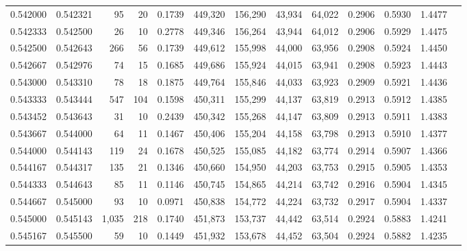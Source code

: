 \begin{tabular}{rrrrrrrrrrrrr}
0.542000 & 0.542321 &    95 &  20 &                                     0.1739 & 449,320 & 156,290 &  43,934 &  64,022 & 0.2906 & 0.5930 & 1.4477 \\
0.542333 & 0.542500 &    26 &  10 &                                     0.2778 & 449,346 & 156,264 &  43,944 &  64,012 & 0.2906 & 0.5929 & 1.4475 \\
0.542500 & 0.542643 &   266 &  56 &                                     0.1739 & 449,612 & 155,998 &  44,000 &  63,956 & 0.2908 & 0.5924 & 1.4450 \\
0.542667 & 0.542976 &    74 &  15 &                                     0.1685 & 449,686 & 155,924 &  44,015 &  63,941 & 0.2908 & 0.5923 & 1.4443 \\
0.543000 & 0.543310 &    78 &  18 &                                     0.1875 & 449,764 & 155,846 &  44,033 &  63,923 & 0.2909 & 0.5921 & 1.4436 \\
0.543333 & 0.543444 &   547 & 104 &                                     0.1598 & 450,311 & 155,299 &  44,137 &  63,819 & 0.2913 & 0.5912 & 1.4385 \\
0.543452 & 0.543643 &    31 &  10 &                                     0.2439 & 450,342 & 155,268 &  44,147 &  63,809 & 0.2913 & 0.5911 & 1.4383 \\
0.543667 & 0.544000 &    64 &  11 &                                     0.1467 & 450,406 & 155,204 &  44,158 &  63,798 & 0.2913 & 0.5910 & 1.4377 \\
0.544000 & 0.544143 &   119 &  24 &                                     0.1678 & 450,525 & 155,085 &  44,182 &  63,774 & 0.2914 & 0.5907 & 1.4366 \\
0.544167 & 0.544317 &   135 &  21 &                                     0.1346 & 450,660 & 154,950 &  44,203 &  63,753 & 0.2915 & 0.5905 & 1.4353 \\
0.544333 & 0.544643 &    85 &  11 &                                     0.1146 & 450,745 & 154,865 &  44,214 &  63,742 & 0.2916 & 0.5904 & 1.4345 \\
0.544667 & 0.545000 &    93 &  10 &                                     0.0971 & 450,838 & 154,772 &  44,224 &  63,732 & 0.2917 & 0.5904 & 1.4337 \\
0.545000 & 0.545143 & 1,035 & 218 &                                     0.1740 & 451,873 & 153,737 &  44,442 &  63,514 & 0.2924 & 0.5883 & 1.4241 \\
0.545167 & 0.545500 &    59 &  10 &                                     0.1449 & 451,932 & 153,678 &  44,452 &  63,504 & 0.2924 & 0.5882 & 1.4235 \\

\end{tabular}

